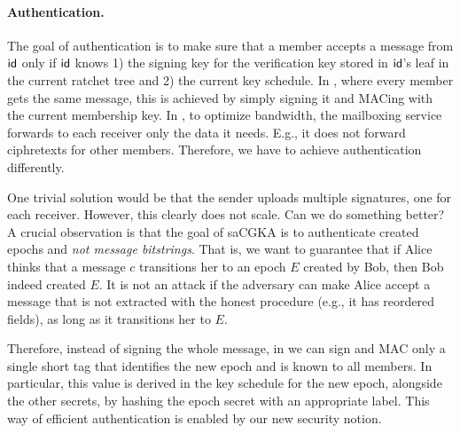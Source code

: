 \paragraph{Authentication.}
The goal of authentication is to make sure that a member accepts a message from ${\mathsf{id}}$ only if ${\mathsf{id}}$ knows 1) the signing key for the verification key stored in ${\mathsf{id}}$'s leaf in the current ratchet tree and 2) the current key schedule.
In \protITK, where every member gets the same message, this is achieved by simply signing it and MACing with the current membership key.
In \saik, to optimize bandwidth, the mailboxing service forwards to each receiver
only the data it needs. E.g., it does not forward ciphretexts for other members. Therefore, we have to achieve authentication differently.

One trivial solution would be that the sender uploads multiple signatures, one for each receiver. However, this clearly does not scale. Can we do something better?
A crucial observation is that the goal of saCGKA is to authenticate created epochs and \emph{not message
  bitstrings}. That is, we want to guarantee that if Alice thinks that a message $c$ transitions her to an epoch $E$
created by Bob, then Bob indeed created $E$. It is not an attack if the adversary can make Alice accept a message that
is not extracted with the honest procedure (e.g., it has reordered fields), as long as it transitions her to $E$.

Therefore, instead of signing the whole message, in \saik we can sign and MAC only a single short tag that identifies the new epoch and is known to all members. In particular, this value is derived in the key schedule for the new epoch, alongside the other secrets, by hashing the epoch secret with an appropriate label.
%
This way of efficient authentication is enabled by our new security notion.

